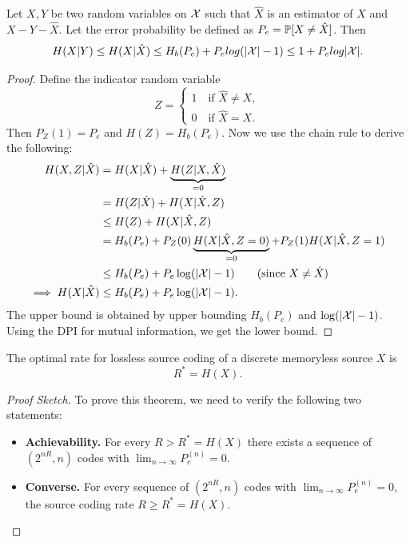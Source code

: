 \documentclass[11pt,a4paper]{article}
\begin{document}
\begin{theorem}
    Let $X, Y$ be two random variables on $\mathcal{X}$ such that $\hat{X}$ is an estimator of $X$ and $X - Y - \hat{X}$. Let the error probability be defined as $P_e = \mathbb{P}[X \neq \hat{X}]$. Then 
    \begin{equation*}
        H(X|Y) \le H(X|\hat{X}) \le H_b(P_e) + P_e log(|\mathcal{X}|-1) \le 1 + P_e log|\mathcal{X}|. 
    \end{equation*}
\end{theorem}

\begin{proof}
    Define the indicator random variable 
    \begin{equation*}
        Z = \begin{cases}
            1\quad\text{if } \hat{X}\neq X,\\
            0\quad\text{if } \hat{X} = X.
        \end{cases}
    \end{equation*}
    Then $P_Z(1) = P_e$ and $H(Z) = H_b(P_e)$. Now we use the chain rule to derive the following:
    \begin{align*}
        H(X,Z|\hat{X}) &= H(X|\hat{X}) + \underbrace{H(Z|X,\hat{X})}_{=0} \\
        &= H(Z|\hat{X}) + H(X|\hat{X},Z) \\
        &\le H(Z) + H(X|\hat{X},Z) \\
        &= H_b(P_e) + P_Z(0)\underbrace{H(X|\hat{X},Z = 0)}_{=0} + P_Z(1)H(X|\hat{X},Z = 1) \\
        &\le H_b(P_e) + P_e\log(|\X|-1) \tag{since $X\neq\hat{X}$} \\
        \implies H(X|\hat{X}) &\le H_b(P_e) + P_e\log(|\X|-1).
    \end{align*}
    The upper bound is obtained by upper bounding $H_b(P_e)$ and $\log(|\mathcal{X}|-1)$. Using the DPI for mutual information, we get the lower bound.
\end{proof}

\begin{theorem} 
    The optimal rate for lossless source coding of a discrete memoryless source $X$ is 
    \begin{equation*}
        R^* = H(X).
    \end{equation*}
\end{theorem}

\begin{proof}[Proof Sketch]\renewcommand{\qedsymbol}{}
    To prove this theorem, we need to verify the following two statements:
    \begin{itemize}
        \item \textbf{Achievability.} For every $R > R^* = H(X)$ there exists a sequence of $(2^{nR}, n)$ codes with $\lim_{n\rightarrow \infty} P_e^{(n)} = 0$.
        \item \textbf{Converse.} For every sequence of $(2^{nR}, n)$ codes with $\lim_{n\rightarrow \infty} P_e^{(n)} = 0$, the source coding rate $R \ge R^* = H(X)$.
    \end{itemize}
\end{proof}
\end{document}
